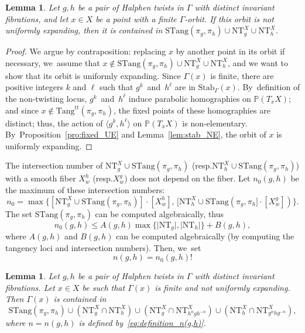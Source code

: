 \documentclass[11pt]{article}
\newcommand{\resp}{resp.\xspace}
\newcommand{\bset}[1]{\bigl\{#1\bigr\}}
\newcommand{\pp}{\mathbb{P}}\let\P\pp
\newcommand{\Tang}{{\mathrm{Tang}}}
\newcommand{\STang}{{\mathrm{STang}}}
\newcommand{\NT}{{\mathrm{NT}}}
\theoremstyle{plain}
\newtheorem{lem}[thm]{Lemma}
\theoremstyle{definition}
\numberwithin{equation}{section}
\begin{document}
\begin{lem}\label{lem:NT1}
Let $g,h$ be a pair of Halphen twists in $\Gamma$ with distinct invariant fibrations, and let $x\in X$ be a point with a finite $\Gamma$-orbit.
If this orbit is not uniformly expanding, then
it is contained in
$ \STang(\pi_g, \pi_h)\cup \NT_g^X\cup \NT_h^X$.
\end{lem}

\begin{proof}
We argue by contraposition: replacing $x$ by another point in its orbit if necessary, we~assume that $x\notin \STang(\pi_g, \pi_h)\cup \NT_g^X\cup \NT_h^X$, and we want to show that its orbit is
uniformly expanding.
Since $\Gamma(x)$ is finite, there are positive integers $k$ and $\ell$
such that $g^k$~and~$h^\ell$ are in $\mathrm{Stab}_\Gamma(x)$. By~definition of the non-twisting locus,
$g^k$~and~$h^\ell$
induce parabolic homographies on $\pp(T_xX)$; and since $x\notin \Tang^{tt}(\pi_g,\pi_h)$, the
fixed points of these homographies are distinct; thus, the action of
$\langle g^k, h^\ell\rangle$ on $\pp(T_xX)$ is non-elementary. By~Proposition~\ref{pro:fixed_UE} and Lemma~\ref{lem:stab_NE}, the orbit of $x$ is uniformly expanding. \end{proof}

The intersection number of $\NT_g^X \cup \STang(\pi_g, \pi_h)$ (\resp $\NT_h^X \cup \STang(\pi_g, \pi_h)$) with a smooth fiber $X_w^h$ (\resp $X_w^g$) does not depend on the fiber. Let $n_0(g,h)$ be the maximum of these intersection numbers:
\begin{equation}\label{eq:definition_n0}
n_0=\max\bset{[\NT_g^X \cup \STang(\pi_g, \pi_h)] \cdot [X_w^h],\,  [\NT_h^X \cup \STang(\pi_g, \pi_h]\cdot [X_w^g])}.
\end{equation}
The set $\STang(\pi_g, \pi_h)$ can be computed algebraically, thus
\begin{equation*}
n_0(g,h)\leq A(g,h) \max\bset{\vert \NT_g\vert, \vert \NT_h\vert} + B(g,h),
\end{equation*}
where $A(g,h)$ and $B(g,h)$ can be computed algebraically (by computing the tangency loci and intersection numbers).
Then, we~set
\begin{equation}\label{eq:definition_n(g,h)}
n(g,h)=n_0(g,h) !
\end{equation}

\begin{lem}\label{lem:definition_of_bad(g,h)}
Let $g,h$ be a pair of Halphen twists in $\Gamma$ with distinct invariant fibrations. Let
$x\in X$ be such that $\Gamma(x)$ is finite and not
uniformly expanding. Then $\Gamma(x)$ is contained in
\[
\STang(\pi_g, \pi_h) \cup
(\NT_g^X\cap \NT_h^X)\cup (\NT_g^X\cap \NT_{h^n gh^{-n}}^X) \cup (\NT_h^X\cap \NT_{g^nhg^{-n}}^X),
\]
where $n=n(g,h)$ is defined by~\eqref{eq:definition_n(g,h)}.
\end{lem}
\end{document}
